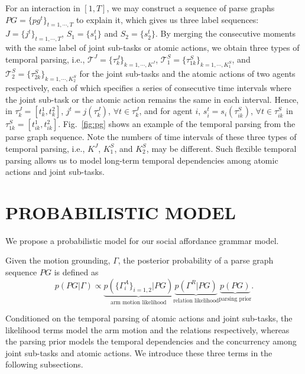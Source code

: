 \documentclass[letterpaper, 10 pt, conference]{ieeeconf}  %
\begin{document}
    For an interaction in $[1, T]$, we may construct a sequence of parse graphs $PG = \{pg^t\}_{t = 1,\cdots,T}$ to explain it, which gives us three label sequences: $J = \{j^t\}_{t = 1,\cdots,T}$, $S_1 = \{s_1^t\}$ and $S_2 = \{s_2^t\}$. By merging the consecutive moments with the same label of joint sub-tasks or atomic actions, we obtain three types of temporal parsing, i.e., $\mathcal{T}^J = \{\tau^J_k\}_{k = 1,\cdots,K^J}$, $\mathcal{T}_1^S = \{\tau^S_{1k}\}_{k = 1,\cdots,K_1^S}$, and $\mathcal{T}_2^S = \{\tau^S_{2k}\}_{k = 1,\cdots,K_2^S}$ for the joint sub-tasks and the atomic actions of two agents respectively, each of which specifies a series of consecutive time intervals where the joint sub-task or the atomic action remains the same in each interval. Hence, in $\tau_k^J = [t_k^1, t_k^2]$, $j^t = j(\tau_k^J)$, $\forall t \in \tau_k^J$, and for agent $i$, $s_i^t = s_i(\tau_{ik}^S)$, $\forall t \in \tau_{ik}^S$ in $\tau_{1k}^S = [t_{ik}^1, t_{ik}^2]$. Fig.~\ref{fig:pg} shows an example of the temporal parsing from the parse graph sequence. Note the numbers of time intervals of these three types of temporal parsing, i.e., $K^J$, $K_1^S$, and $K_2^S$, may be different. Such flexible temporal parsing allows us to model long-term temporal dependencies among atomic actions and joint sub-tasks. %
   
   
   
\section{PROBABILISTIC MODEL}

We propose a probabilistic model for our social affordance grammar model. 

Given the motion grounding, $\Gamma$, the posterior probability of a parse graph sequence $PG$ is defined as
\begin{equation}
 p(PG | \Gamma)\propto \underbrace{p(\{\Gamma_i^A\}_{i=1,2} | PG)}_{\text{arm motion likelihood}} \underbrace{p(\Gamma^R | PG)}_{\text{relation likelihood}} \underbrace{p(PG)}_{\text{parsing prior}}.
\label{eq:posterior}
\end{equation}

Conditioned on the temporal parsing of atomic actions and joint sub-tasks, the likelihood terms model the arm motion and the relations respectively, whereas the parsing prior models the temporal dependencies and the concurrency among joint sub-tasks and atomic actions. We introduce these three terms in the following subsections.
\end{document}
